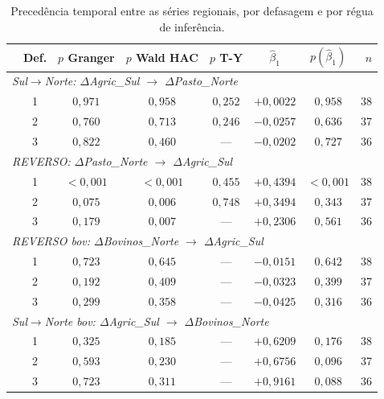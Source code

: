 \begin{table}[!ht]
\centering
\caption[Precedência temporal entre séries regionais]{Precedência temporal entre as séries regionais, por defasagem e por régua de inferência.}
\label{tab:precedencia}
\footnotesize
\begin{tabular}{lccccccr}
\toprule
& \textbf{Def.} & \textbf{$p$ Granger} & \textbf{$p$ Wald HAC} & \textbf{$p$ T-Y} & \textbf{$\hat{\beta}_1$} & \textbf{$p(\hat{\beta}_1)$} & \textbf{$n$} \\
\midrule
\multicolumn{8}{l}{\textit{Sul$\rightarrow$Norte: $\Delta$Agric\_Sul $\rightarrow$ $\Delta$Pasto\_Norte}} \\
 & 1 & $0{,}971$ & $0{,}958$ & $0{,}252$ & $+0{,}0022$ & $0{,}958$ & 38 \\
 & 2 & $0{,}760$ & $0{,}713$ & $0{,}246$ & $-0{,}0257$ & $0{,}636$ & 37 \\
 & 3 & $0{,}822$ & $0{,}460$ & --- & $-0{,}0202$ & $0{,}727$ & 36 \\
\multicolumn{8}{l}{\textit{REVERSO:   $\Delta$Pasto\_Norte $\rightarrow$ $\Delta$Agric\_Sul}} \\
 & 1 & $<0{,}001$ & $<0{,}001$ & $0{,}455$ & $+0{,}4394$ & $<0{,}001$ & 38 \\
 & 2 & $0{,}075$ & $0{,}006$ & $0{,}748$ & $+0{,}3494$ & $0{,}343$ & 37 \\
 & 3 & $0{,}179$ & $0{,}007$ & --- & $+0{,}2306$ & $0{,}561$ & 36 \\
\multicolumn{8}{l}{\textit{REVERSO bov: $\Delta$Bovinos\_Norte $\rightarrow$ $\Delta$Agric\_Sul}} \\
 & 1 & $0{,}723$ & $0{,}645$ & --- & $-0{,}0151$ & $0{,}642$ & 38 \\
 & 2 & $0{,}192$ & $0{,}409$ & --- & $-0{,}0323$ & $0{,}399$ & 37 \\
 & 3 & $0{,}299$ & $0{,}358$ & --- & $-0{,}0425$ & $0{,}316$ & 36 \\
\multicolumn{8}{l}{\textit{Sul$\rightarrow$Norte bov: $\Delta$Agric\_Sul $\rightarrow$ $\Delta$Bovinos\_Norte}} \\
 & 1 & $0{,}325$ & $0{,}185$ & --- & $+0{,}6209$ & $0{,}176$ & 38 \\
 & 2 & $0{,}593$ & $0{,}230$ & --- & $+0{,}6756$ & $0{,}096$ & 37 \\
 & 3 & $0{,}723$ & $0{,}311$ & --- & $+0{,}9161$ & $0{,}088$ & 36 \\
\bottomrule
\end{tabular}

\end{table}
